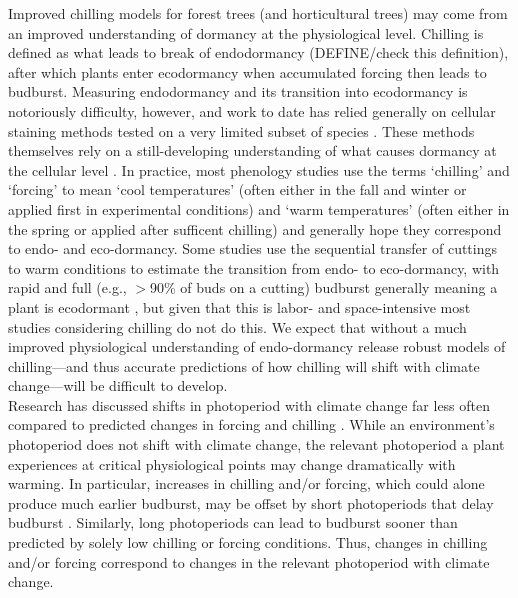 \documentclass[11pt,letter]{article}
\begin{document}
Improved chilling models for forest trees (and horticultural trees) may come from an improved understanding of dormancy at the physiological level. Chilling is defined as what leads to break of endodormancy (DEFINE/check this definition), after which plants enter ecodormancy when accumulated forcing then leads to budburst. Measuring endodormancy and its transition into ecodormancy is notoriously difficulty, however, and work to date has relied generally on cellular staining methods tested on a very limited subset of species \citep{rinne2011}. These methods themselves rely on a still-developing understanding of what causes dormancy at the cellular level \citep{vanderschoot2014}. In practice, most phenology studies use the terms `chilling' and `forcing' to mean `cool temperatures' (often either in the fall and winter or applied first in experimental conditions) and `warm temperatures' (often either in the spring or applied after sufficent chilling) and generally hope they correspond to endo- and eco-dormancy. Some studies use the sequential transfer of cuttings to warm conditions to estimate the transition from endo- to eco-dormancy, with rapid and full (e.g., $>$90\% of buds on a cutting) budburst generally meaning a plant is ecodormant \citep[e.g.,][]{Junttila:2012aa}, but given that this is labor- and space-intensive most studies considering chilling do not do this. We expect that without a much improved physiological understanding of endo-dormancy release robust models of chilling---and thus accurate predictions of how chilling will shift with climate change---will be difficult to develop. \\ %

Research has discussed shifts in photoperiod with climate change far less often compared to predicted changes in forcing and chilling \citep[but see][]{saikkonen2012,way2015}. While an environment's photoperiod does not shift with climate change, the relevant photoperiod a plant experiences at critical physiological points may change dramatically with warming. In particular, increases in chilling and/or forcing, which could alone produce much earlier budburst, may be offset by short photoperiods that delay budburst \citep{gauzere2019}. Similarly, long photoperiods can lead to budburst sooner than predicted by solely low chilling or forcing conditions. Thus, changes in chilling and/or forcing correspond to changes in the relevant photoperiod with climate change. \\
\end{document}
